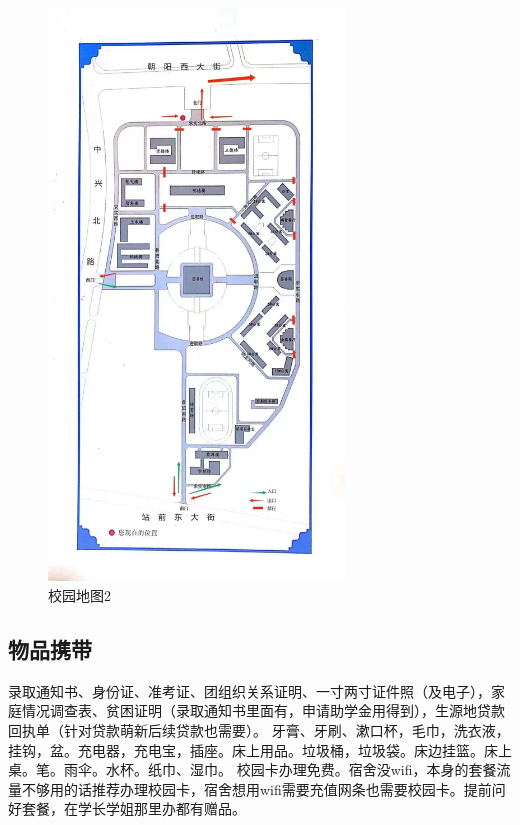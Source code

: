 \documentclass[12pt]{article} %
\begin{document}
	\begin{figure}[!h]
	\centering
	\includegraphics[width=0.7\textwidth]{2024072555.jpg}
	\caption{校园地图2}
\end{figure}
			\newpage

	\subsection{物品携带}
	 录取通知书、身份证、准考证、团组织关系证明、一寸两寸证件照（及电子），家庭情况调查表、贫困证明（录取通知书里面有，申请助学金用得到），生源地贷款回执单（针对贷款萌新后续贷款也需要）。
	\frameboxend
	牙膏、牙刷、漱口杯，毛巾，洗衣液，挂钩，盆。充电器，充电宝，插座。床上用品。垃圾桶，垃圾袋。床边挂篮。床上桌。笔。雨伞。水杯。纸巾、湿巾。
	\frameboxend
	校园卡办理免费。宿舍没wifi，本身的套餐流量不够用的话推荐办理校园卡，宿舍想用wifi需要充值网条也需要校园卡。提前问好套餐，在学长学姐那里办都有赠品。
	\frameboxend
\end{document}

